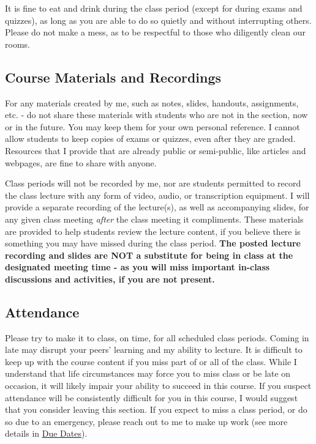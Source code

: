 \documentclass[
  12pt,
  letterpaper,
]{scrartcl}
\begin{document}
It is fine to eat and drink during the class period (except for during
exams and quizzes), as long as you are able to do so quietly and without
interrupting others. Please do not make a mess, as to be respectful to
those who diligently clean our rooms.

\subsection{Course Materials and
Recordings}\label{course-materials-and-recordings}

For any materials created by me, such as notes, slides, handouts,
assignments, etc. - do not share these materials with students who are
not in the section, now or in the future. You may keep them for your own
personal reference. I cannot allow students to keep copies of exams or
quizzes, even after they are graded. Resources that I provide that are
already public or semi-public, like articles and webpages, are fine to
share with anyone.

Class periods will not be recorded by me, nor are students permitted to
record the class lecture with any form of video, audio, or transcription
equipment. I will provide a separate recording of the lecture(s), as
well as accompanying slides, for any given class meeting \emph{after}
the class meeting it compliments. These materials are provided to help
students review the lecture content, if you believe there is something
you may have missed during the class period. \textbf{The posted lecture
recording and slides are NOT a substitute for being in class at the
designated meeting time - as you will miss important in-class
discussions and activities, if you are not present.}

\subsection{Attendance}\label{attendance}

Please try to make it to class, on time, for all scheduled class
periods. Coming in late may disrupt your peers' learning and my ability
to lecture. It is difficult to keep up with the course content if you
miss part of or all of the class. While I understand that life
circumstances may force you to miss class or be late on occasion, it
will likely impair your ability to succeed in this course. If you
suspect attendance will be consistently difficult for you in this
course, I would suggest that you consider leaving this section. If you
expect to miss a class period, or do so due to an emergency, please
reach out to me to make up work (see more details in
\hyperref[due-dates]{Due Dates}).
\end{document}
